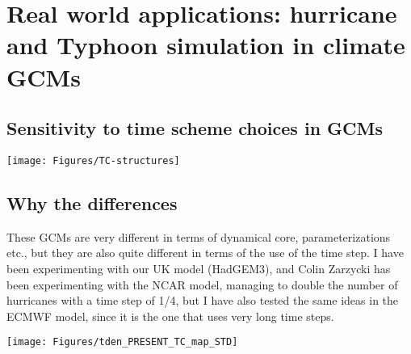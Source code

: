 \section{Real world applications: hurricane and Typhoon simulation in climate GCMs}

\subsection{Sensitivity to time scheme choices in GCMs}

\begin{center}	
	\texttt{[image: Figures/TC-structures]}
\end{center}

\subsection{Why the differences}
These GCMs are very different in terms of dynamical core, parameterizations etc., but they are also quite different in terms of the use of the time step. I have been experimenting with our UK model (HadGEM3), and Colin Zarzycki has been experimenting with the NCAR model, managing to double the number of hurricanes with a time step of 1/4, but I have also tested the same ideas in the ECMWF model, since it is the one that uses very long time steps.
\begin{center}	
	\texttt{[image: Figures/tden\_PRESENT\_TC\_map\_STD]}
\end{center}